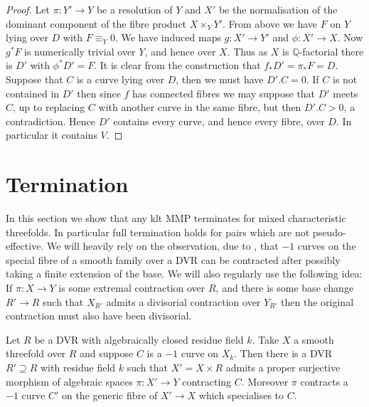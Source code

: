 \documentclass[a4paper,12pt]{amsart}
\begin{document}
	\begin{proof}
		
		Let $\pi \colon Y' \to Y$ be a resolution of $Y$ and $X'$ be the normalisation of the dominant component of the fibre product $X\times_{Y} Y'$. From above we have $F$ on $Y$ lying over $D$ with $F \equiv_{Y} 0$. We have induced maps $g\colon X' \to Y'$ and $\phi\colon  X' \to X$. Now $g^{*}F$ is numerically trivial over $Y$, and hence over $X$. Thus as $X$ is $\mathbb{Q}$-factorial there is $D'$ with $\phi^{*}D'=F$. It is clear from the construction that $f_{*}D'=\pi_{*}F=D$. Suppose that $C$ is a curve lying over $D$, then we must have $D'.C =0$. If $C$ is not contained in $D'$ then since $f$ has connected fibres we may suppose that $D'$ meets $C$, up to replacing $C$ with another curve in the same fibre, but then $D'.C > 0$, a contradiction. Hence $D'$ contains every curve, and hence every fibre, over $D$. In particular it contains $V$.
		
		
	\end{proof}
		
	
	\section{Termination}
	
	In this section we show that any klt MMP terminates for mixed characteristic threefolds. In particular full termination holds for pairs which are not pseudo-effective.	We will heavily rely on the observation, due to \cite{katsura1985elliptic}, that $-1$ curves on the special fibre of a smooth family over a DVR can be contracted after possibly taking a finite extension of the base. We will also regularly use the following idea: If $\pi:X \to Y$ is some extremal contraction over $R$, and there is some base change $R' \to R$ such that $X_{R'}$ admits a divisorial contraction over $Y_{R'}$ then the original contraction must also have been divisorial.
	
	
	\begin{lemma}\cite[Lemma 9.4]{katsura1985elliptic} \label{KU}
		Let $R$ be a DVR with algebraically closed residue field $k$. Take $X$ a smooth threefold over $R$ and suppose $C$ is a $-1$ curve on $X_{k}$. Then there is a DVR $R' \supseteq R$ with residue field $k$ such that $X'=X\times R$ admits a proper surjective morphism of algebraic spaces $\pi:X' \to Y$  contracting $C$. Moreover $\pi$ contracts a $-1$ curve $C'$ on the generic fibre of $X' \to X$ which specialises to $C$.
	\end{lemma}
	
\end{document}
